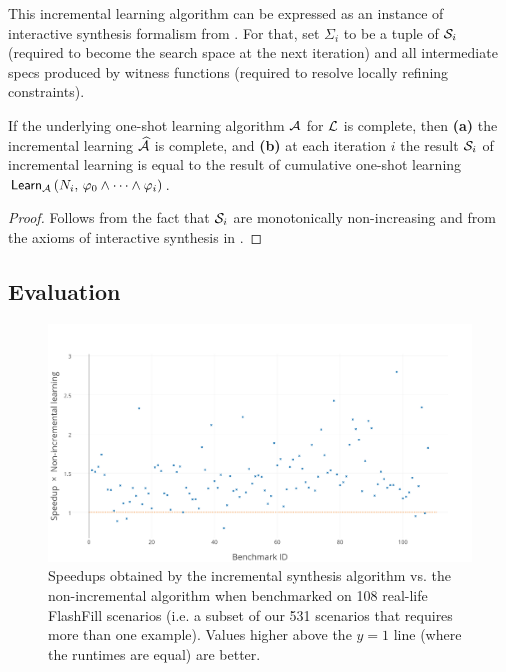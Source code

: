 This incremental learning algorithm can be expressed as an instance of interactive synthesis formalism from
.
For that, set $\Sigma_i$ to be a tuple of $\mathcal{S}_i$ (required to become the search space at the next
iteration) and all intermediate specs produced by witness functions (required to resolve locally refining constraints).

\begin{theorem}
    If the underlying one-shot learning algorithm $\mathcal{A}$ for $\mathcal{L}$ is complete, then
    \textbf{(a)} the incremental learning $\widehat{\mathcal{A}}$ is complete, and
    \textbf{(b)} at each iteration $i$ the result $\mathcal{S}_i$ of incremental learning is equal to the result of
    cumulative one-shot learning $\mathsf{Learn}_{\mathcal{A}}\left(N_i,\, \varphi_0 \wedge \dots \wedge
    \varphi_i\right)$.
    \label{th:incremental:complete}
\end{theorem}
\begin{proof}
    Follows from the fact that $\mathcal{S}_i$ are monotonically non-increasing and from the axioms of interactive
    synthesis in .
\end{proof}

\subsection{Evaluation}

\begin{figure}[t]
    \centering
    \includegraphics[width=0.99\linewidth]{figures/incremental-learning-performance}
    \caption{Speedups obtained by the incremental synthesis algorithm vs. the non-incremental algorithm when benchmarked
        on 108 real-life FlashFill scenarios (i.e. a subset of our 531 scenarios that requires more than one example).
        Values higher above the $y=1$ line (where the runtimes are equal) are better.}
    \label{fig:interactive:incremental:speedup}
\end{figure}

